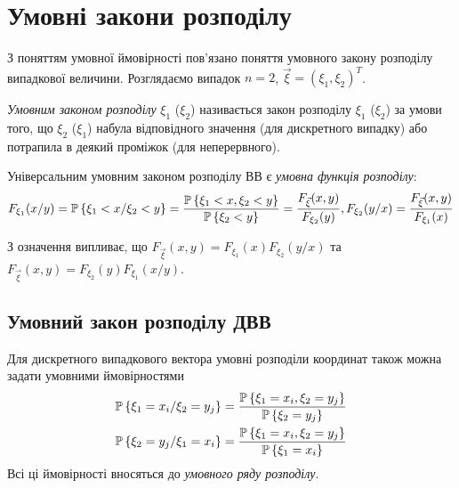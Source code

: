 
\section{Умовні закони розподілу}
З поняттям умовної ймовірності пов'язано поняття умовного закону розподілу випадкової величини.
Розглядаємо випадок $n = 2$, $\vec{\xi} = \left(\xi_1, \xi_2\right)^T$.

\begin{definition}
    \emph{Умовним законом розподілу} $\xi_1$ ($\xi_2$) називається закон розподілу 
    $\xi_1$ ($\xi_2$) за умови того, що $\xi_2$ ($\xi_1$) набула відповідного значення (для дискретного випадку) 
    або потрапила в деякий проміжок (для неперервного).
\end{definition}

\begin{definition}
    Універсальним умовним законом розподілу ВВ є \emph{умовна функція 
    розподілу}:
    \begin{equation*}
        F_{\xi_1}(x/y) = \P\left\{{\xi_1 < x}/{\xi_2 < y}\right\} = 
        \frac{\P\left\{\xi_1 < x, \xi_2 < y\right\}}
        {\P\left\{\xi_2 < y\right\}} = 
        \frac{F_{\vec{\xi}}(x, y)}{F_{\xi_2}(y)}, F_{\xi_2}(y/x) = \frac{F_{\vec{\xi}}(x, y)}{F_{\xi_1}(x)}
    \end{equation*}
\end{definition}
\begin{remark}
    З означення випливає, що 
    $F_{\vec{\xi}}(x,y) = F_{\xi_1}(x)F_{\xi_2}(y/x)$
    та 
    $F_{\vec{\xi}}(x,y) = F_{\xi_2}(y)F_{\xi_1}(x/y)$.
\end{remark}

\subsection{Умовний закон розподілу ДВВ}
Для дискретного випадкового вектора умовні розподіли координат також можна задати умовними ймовірностями
\begin{gather}
    \label{eq:discr_cond_x}
    \P\left\{\xi_1 = x_i / \xi_2 = y_j\right\} = 
    \frac{\P\left\{\xi_1 = x_i , \xi_2 = y_j\right\}}
    {\P\left\{\xi_2 = y_j\right\}} \\
    \label{eq:discr_cond_y}
    \P\left\{\xi_2 = y_j / \xi_1 = x_i\right\} = 
    \frac{\P\left\{\xi_1 = x_i , \xi_2 = y_j\right\}}
    {\P\left\{\xi_1 = x_i\right\}}
\end{gather}
Всі ці ймовірності вносяться до \emph{умовного ряду розподілу}.

